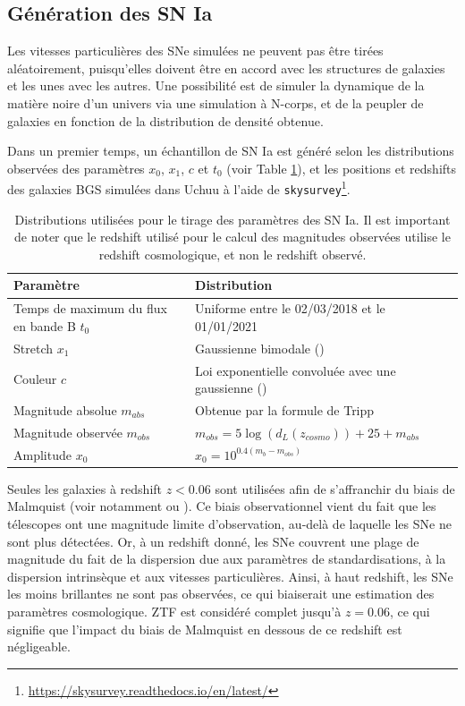 \documentclass{book}
\def\skysurvey{\texttt{skysurvey}\xspace}
\begin{document}
\subsection{Génération des SN Ia}
\label{sec:gen_SN}

Les vitesses particulières des SNe simulées ne peuvent pas être tirées aléatoirement, puisqu'elles doivent être en accord avec les structures de galaxies et les unes avec les autres. Une possibilité est de simuler la dynamique de la matière noire d'un univers via une simulation à N-corps, et de la peupler de galaxies en fonction de la distribution de densité obtenue. 

Dans un premier temps, un échantillon de SN Ia est généré selon les distributions observées des paramètres $x_0$, $x_1$, $c$ et $t_0$ (voir Table \ref{tab:snia}), et les positions et redshifts des galaxies BGS simulées dans Uchuu à l'aide de \skysurvey\footnote{\href{https://skysurvey.readthedocs.io/en/latest/}{https://skysurvey.readthedocs.io/en/latest/}}.

\begin{table}
    \centering
    \begin{tabular}{p{6.5cm}|p{7cm}}
         Paramètre & Distribution \\
         \hline
         Temps de maximum du flux en bande B $t_0$ & Uniforme entre le 02/03/2018 et le 01/01/2021\\
         Stretch $x_1$ & Gaussienne bimodale (\cite{nicolas_redshift_2021})\\
         Couleur $c$ &  Loi exponentielle convoluée avec une gaussienne (\cite{ginolin_ztf_2024}) \\
         Magnitude absolue $m_{abs}$ & Obtenue par la formule de Tripp\\
         Magnitude observée $m_{obs}$ & $m_{obs} = 5 \log(d_L(z_{cosmo})) + 25 + m_{abs}$\\
         Amplitude $x_0$ & $x_0 = 10^{0.4(m_b - m_{obs})}$
    \end{tabular}
    \caption{Distributions utilisées pour le tirage des paramètres des SN Ia. Il est important de noter que le redshift utilisé pour le calcul des magnitudes observées utilise le redshift cosmologique, et non le redshift observé.}
    \label{tab:snia}
\end{table}

Seules les galaxies à redshift $z<0.06$ sont utilisées afin de s'affranchir du biais de Malmquist (voir notamment \cite{carreres_growth-rate_2023} ou \cite{boyd_accounting_2024}). Ce biais observationnel vient du fait que les télescopes ont une magnitude limite d'observation, au-delà de laquelle les SNe ne sont plus détectées. Or, à un redshift donné, les SNe couvrent une plage de magnitude du fait de la dispersion due aux paramètres de standardisations, à la dispersion intrinsèque et aux vitesses particulières. Ainsi, à haut redshift, les SNe les moins brillantes ne sont pas observées, ce qui biaiserait une estimation des paramètres cosmologique. ZTF est considéré complet jusqu'à $z=0.06$, ce qui signifie que l'impact du biais de Malmquist en dessous de ce redshift est négligeable.
\end{document}
